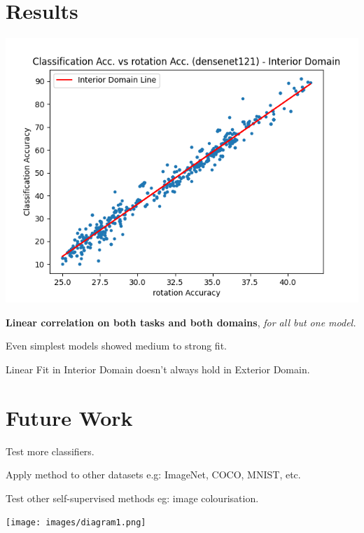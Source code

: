 \documentclass[a4paper]{article}
\begin{document}
{\begin{multicols}{2}
        \section{Results}
        \vspace{-0.3cm}
        \includegraphics[scale=0.44]{images/sample1.png}
        \begin{compactitem}
            \item \textbf{Linear correlation on both tasks and both domains}, \textit{for all but one model.}
            \item Even simplest models showed medium to strong fit.
            \item Linear Fit in Interior Domain doesn't always hold in Exterior Domain.
        \end{compactitem}
        \vspace{-0.4cm}
        \section{Future Work}
        \vspace{-0.3cm}
        \begin{compactitem}
            \item Test more classifiers.
            \item Apply method to other datasets e.g: ImageNet, COCO, MNIST, etc.
            \item Test other self-supervised methods eg: image colourisation.
        \end{compactitem}
        \vspace{0.3cm}
        \texttt{[image: images/diagram1.png]}
    
    \end{multicols}
}
\end{document}

